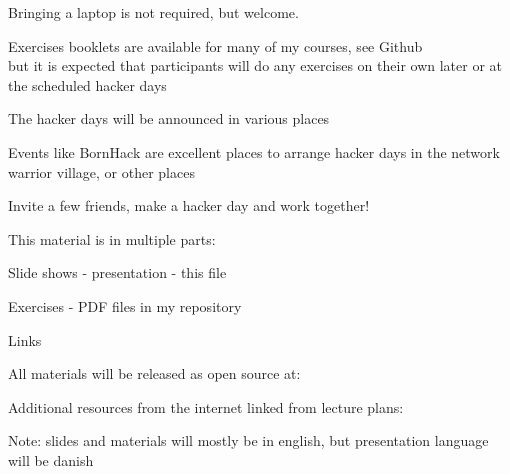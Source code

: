 \documentclass[Screen16to9,17pt]{foils}
\begin{document}

\begin{list2}
\item Bringing a laptop is not required, but welcome.
\item Exercises booklets are available for many of my courses, see Github\\
but it is expected that participants will do any exercises on their own later or at the scheduled hacker days
\item The hacker days will be announced in various places

\item Events like BornHack are excellent places to arrange hacker days in the network warrior village, or other places
\end{list2}

\vskip 1cm

\centerline{\LARGE Invite a few friends, make a hacker day and work together!}


\begin{list1}
\item This material is in multiple parts:
\begin{list2}
\item Slide shows - presentation - this file
\item Exercises - PDF files in my repository
\end{list2}
\item Links
\begin{list2}
\item All materials will be released as open source at:\\
\item Additional resources from the internet linked from lecture plans:\\
\end{list2}
\end{list1}

Note: slides and materials will mostly be in english, but presentation language will be danish

\end{document}
